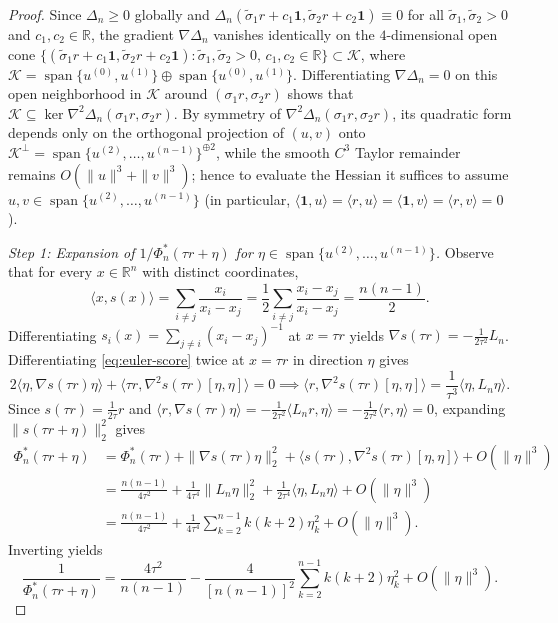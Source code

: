 \documentclass[11pt,a4paper]{article}
\theoremstyle{definition}
\DeclareMathOperator{\Span}{span}
\newcommand{\R}{\mathbb{R}}
\newcommand{\one}{\mathbf{1}}
\begin{document}
\begin{proof}
Since $\Delta_n \ge 0$ globally and $\Delta_n(\tilde{\sigma}_1 r + c_1 \one, \tilde{\sigma}_2 r + c_2 \one) \equiv 0$ for all $\tilde{\sigma}_1, \tilde{\sigma}_2 > 0$ and $c_1, c_2 \in \R$, the gradient $\nabla \Delta_n$ vanishes identically on the $4$-dimensional open cone $\{(\tilde{\sigma}_1 r + c_1 \one, \tilde{\sigma}_2 r + c_2 \one) : \tilde{\sigma}_1, \tilde{\sigma}_2 > 0,\, c_1, c_2 \in \R\} \subset \mathcal{K}$, where $\mathcal{K} = \Span\{u^{(0)}, u^{(1)}\} \oplus \Span\{u^{(0)}, u^{(1)}\}$. Differentiating $\nabla \Delta_n = 0$ on this open neighborhood in $\mathcal{K}$ around $(\sigma_1 r, \sigma_2 r)$ shows that $\mathcal{K} \subseteq \ker \nabla^2 \Delta_n(\sigma_1 r, \sigma_2 r)$. By symmetry of $\nabla^2 \Delta_n(\sigma_1 r, \sigma_2 r)$, its quadratic form depends only on the orthogonal projection of $(u, v)$ onto $\mathcal{K}^\perp = \Span\{u^{(2)}, \dots, u^{(n-1)}\}^{\oplus 2}$, while the smooth $C^3$ Taylor remainder remains $O(\|u\|^3 + \|v\|^3)$; hence to evaluate the Hessian it suffices to assume $u, v \in \Span\{u^{(2)}, \dots, u^{(n-1)}\}$ (in particular, $\langle \one, u\rangle = \langle r, u\rangle = \langle \one, v\rangle = \langle r, v\rangle = 0$).

\emph{Step 1: Expansion of $1/\Phi_n^*(\tau r + \eta)$ for $\eta \in \Span\{u^{(2)}, \dots, u^{(n-1)}\}$.}
Observe that for every $x \in \R^n$ with distinct coordinates,
\begin{equation}
\label{eq:euler-score}
\langle x, s(x) \rangle = \sum_{i \neq j} \frac{x_i}{x_i - x_j} = \frac{1}{2} \sum_{i \neq j} \frac{x_i - x_j}{x_i - x_j} = \frac{n(n-1)}{2}.
\end{equation}
Differentiating $s_i(x) = \sum_{j \neq i} (x_i - x_j)^{-1}$ at $x = \tau r$ yields $\nabla s(\tau r) = -\frac{1}{2\tau^2} L_n$. Differentiating \eqref{eq:euler-score} twice at $x = \tau r$ in direction $\eta$ gives
\[
2\langle \eta, \nabla s(\tau r) \eta \rangle + \langle \tau r, \nabla^2 s(\tau r)[\eta, \eta] \rangle = 0 \implies \langle r, \nabla^2 s(\tau r)[\eta, \eta] \rangle = \frac{1}{\tau^3} \langle \eta, L_n \eta \rangle.
\]
Since $s(\tau r) = \frac{1}{2\tau} r$ and $\langle r, \nabla s(\tau r)\eta\rangle = -\frac{1}{2\tau^2}\langle L_n r, \eta\rangle = -\frac{1}{2\tau^2}\langle r, \eta\rangle = 0$, expanding $\|s(\tau r + \eta)\|_2^2$ gives
\begin{align*}
\Phi_n^*(\tau r + \eta)
&= \Phi_n^*(\tau r) + \|\nabla s(\tau r)\eta\|_2^2 + \langle s(\tau r), \nabla^2 s(\tau r)[\eta, \eta]\rangle + O(\|\eta\|^3) \\
&= \frac{n(n-1)}{4\tau^2} + \frac{1}{4\tau^4}\|L_n \eta\|_2^2 + \frac{1}{2\tau^4}\langle \eta, L_n \eta\rangle + O(\|\eta\|^3) \\
&= \frac{n(n-1)}{4\tau^2} + \frac{1}{4\tau^4} \sum_{k=2}^{n-1} k(k+2)\eta_k^2 + O(\|\eta\|^3).
\end{align*}
Inverting yields
\begin{equation}
\label{eq:inv-phi-exp}
\frac{1}{\Phi_n^*(\tau r + \eta)} = \frac{4\tau^2}{n(n-1)} - \frac{4}{[n(n-1)]^2} \sum_{k=2}^{n-1} k(k+2)\eta_k^2 + O(\|\eta\|^3).
\end{equation}


\end{proof}
\end{document}
